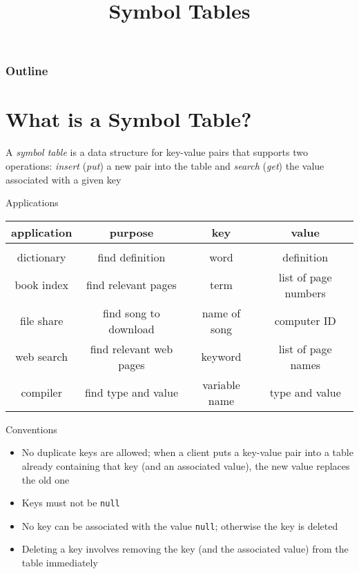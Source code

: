 \documentclass[8pt,a4paper,compress]{beamer}
\title{Symbol Tables}
\date{}
\begin{document}
\begin{frame}
\vfill
\titlepage
\end{frame}

\begin{frame}
\frametitle{Outline}
\tableofcontents
\end{frame}

\section{What is a Symbol Table?}
\begin{frame}[fragile]
A \emph{symbol table} is a data structure for key-value pairs that supports two operations: \emph{insert} (\emph{put}) a new pair into the table and \emph{search} (\emph{get}) the value associated with a given key

\bigskip

Applications 
\begin{center}
\begin{tabular}{cccc}
application & purpose & key & value \\ \hline \\
dictionary & find definition & word & definition \\
book index & find relevant pages & term & list of page numbers \\
file share & find song to download & name of song & computer ID \\
web search & find relevant web pages & keyword & list of page names \\
compiler & find type and value & variable name & type and value \\
\end{tabular} 
\end{center}

\bigskip

Conventions
\begin{itemize}
\item No duplicate keys are allowed; when a client puts a key-value pair into a table already containing that key (and an associated value), the new value replaces the old one

\item Keys must not be \lstinline{null}

\item No key can be associated with the value \lstinline{null}; otherwise the key is deleted

\item Deleting a key involves removing the key (and the associated value) from the table immediately
\end{itemize}
\end{frame}
\end{document}
